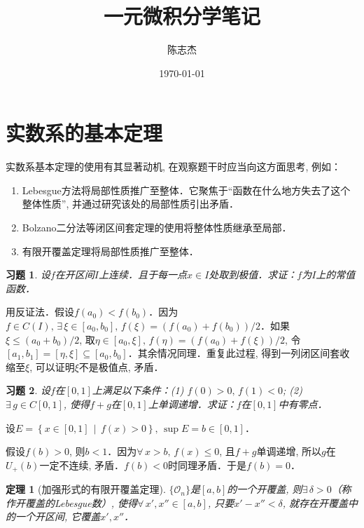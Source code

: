 \documentclass[11pt,a4paper]{ctexart}
\title{一元微积分学笔记}
\author{陈志杰}
\date{\today}
\makeatletter
\theoremstyle{thmseries} %
\newtheorem{thm}{定理}[section]
\theoremstyle{exerseries}
\newtheorem{exer}{习题}[section]
\renewenvironment{proof}[1][\proofname]{\par
  \pushQED{\qed}%
  \normalfont \topsep6\p@\@plus6\p@\relax
  \trivlist
  \item[\hskip\labelsep
        \itshape
    #1\@addpunct{}]\ignorespaces
}{%
  \popQED\endtrivlist\@endpefalse
}
\newenvironment{pf}{\begin{proof}[\bfseries\upshape 证\quad]}{\end{proof}}
\newcommand{\cbra}[1]{\mathopen{}\left\{#1\right\}}
\makeatother
\begin{document}
\maketitle
\thispagestyle{empty}
\tableofcontents
\justifying
\newpage


\section{实数系的基本定理}
实数系基本定理的使用有其显著动机, 在观察题干时应当向这方面思考, 例如：
\begin{enumerate}
	\item Lebesgue方法将局部性质推广至整体．它聚焦于``函数在什么地方失去了这个整体性质'', 并通过研究该处的局部性质引出矛盾．
	\item Bolzano二分法等闭区间套定理的使用将整体性质继承至局部．
	\item 有限开覆盖定理将局部性质推广至整体．
\end{enumerate}

\begin{exer}
	设$f$在开区间$I$上连续．且于每一点$x\in I$处取到极值．求证：$f$为$I$上的常值函数．
\end{exer}
\begin{pf}
	用反证法．假设$f(a_0)<f(b_0)$．因为$f\in C(I),\,\exists\,\xi\in[a_0,b_0],\,f(\xi)=(f(a_0)+f(b_0))/2$．如果$\xi\leq(a_0+b_0)/2$, 取$\eta\in[a_0,\xi],\,f(\eta)=(f(a_0)+f(\xi))/2$, 令$[a_1,b_1]=[\eta,\xi]\subseteq[a_0,b_0]$．其余情况同理．重复此过程, 得到一列闭区间套收缩至$\xi$, 可以证明$\xi$不是极值点, 矛盾．
\end{pf}

\begin{exer}
	设$f$在$[0,1]$上满足以下条件：(1) $f(0)>0,\,f(1)<0$; (2) $\exists\,g\in C[0,1]$, 使得$f+g$在$[0,1]$上单调递增．求证：$f$在$[0,1]$中有零点．
\end{exer}
\begin{pf}
	设$E=\cbra{x\in[0,1]\,\middle\vert\,f(x)>0},\,\sup E=b\in[0,1]$．
	
	假设$f(b)>0$, 则$b<1$．因为$\forall\,x>b,\,f(x)\leq0$, 且$f+g$单调递增, 所以$g$在$U_+(b)$一定不连续, 矛盾．$f(b)<0$时同理矛盾．于是$f(b)=0$．
\end{pf}

\begin{thm}[加强形式的有限开覆盖定理]
	$\{\mathcal{O}_n\}$是$[a,b]$的一个开覆盖, 则$\exists\,\delta>0$（称作开覆盖的Lebesgue数）, 使得$\forall\,x',x''\in[a,b]$, 只要$x'-x''<\delta$, 就存在开覆盖中的一个开区间, 它覆盖$x',x''$．
\end{thm}
\end{document}
